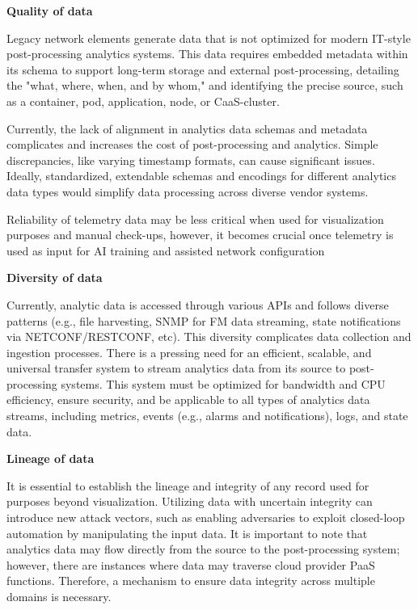 \documentclass[10pt,sigconf]{iabart}
\begin{document}

\textbf{Quality of data} 

Legacy network elements generate data that is not optimized for modern IT-style post-processing analytics systems. This data requires embedded metadata within its schema to support long-term storage and external post-processing, detailing the "what, where, when, and by whom," and identifying the precise source, such as a container, pod, application, node, or CaaS-cluster.

Currently, the lack of alignment in analytics data schemas and metadata complicates and increases the cost of post-processing and analytics. Simple discrepancies, like varying timestamp formats, can cause significant issues. Ideally, standardized, extendable schemas and encodings for different analytics data types would simplify data processing across diverse vendor systems.

Reliability of telemetry data may be less critical when used for visualization purposes and manual check-ups, however, it becomes crucial once telemetry is used as input for AI training and assisted network configuration

\textbf{Diversity of data} 

Currently, analytic data is accessed through various APIs and follows diverse patterns (e.g., file harvesting, SNMP for FM data streaming, state notifications via NETCONF/RESTCONF, etc). This diversity complicates data collection and ingestion processes. There is a pressing need for an efficient, scalable, and universal transfer system to stream analytics data from its source to post-processing systems. This system must be optimized for bandwidth and CPU efficiency, ensure security, and be applicable to all types of analytics data streams, including metrics, events (e.g., alarms and notifications), logs, and state data.

\textbf{Lineage of data}

It is essential to establish the lineage and integrity of any record used for purposes beyond visualization. Utilizing data with uncertain integrity can introduce new attack vectors, such as enabling adversaries to exploit closed-loop automation by manipulating the input data. It is important to note that analytics data may flow directly from the source to the post-processing system; however, there are instances where data may traverse cloud provider PaaS functions. Therefore, a mechanism to ensure data integrity across multiple domains is necessary.
\end{document}

